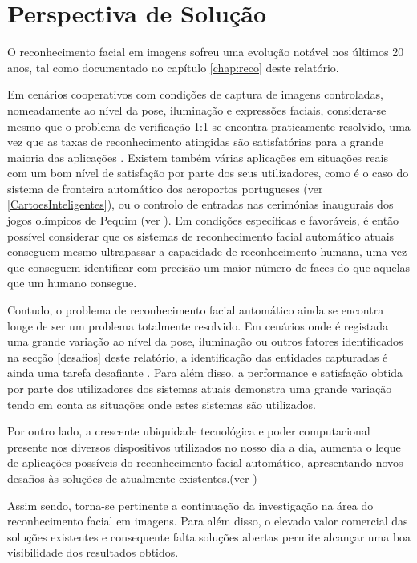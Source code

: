 \chapter{Perspectiva de Solução} \label{chap:solução}

O reconhecimento facial em imagens sofreu uma evolução notável nos últimos 20 anos, tal como documentado no capítulo \ref{chap:reco} deste relatório. 

Em cenários cooperativos com condições de captura de imagens controladas, nomeadamente ao nível da pose, iluminação e expressões faciais, considera-se mesmo que o problema de verificação 1:1 se encontra praticamente resolvido, uma vez que as taxas de reconhecimento atingidas são satisfatórias para a grande maioria das aplicações \citep{Li2011}. Existem também várias aplicações em situações reais com um bom nível de satisfação por parte dos seus utilizadores, como é o caso do sistema de fronteira automático dos aeroportos portugueses (ver \ref{CartoesInteligentes}), ou o controlo de entradas nas cerimónias inaugurais dos jogos olímpicos de Pequim (ver \label{Vigilancia}). Em condições específicas e favoráveis, é então possível considerar que os sistemas de reconhecimento facial automático atuais conseguem mesmo ultrapassar a capacidade de reconhecimento humana, uma vez que conseguem identificar com precisão um maior número de faces do que aquelas que um humano consegue.

Contudo, o problema de reconhecimento facial automático ainda se encontra longe de ser um problema totalmente resolvido. Em cenários onde é registada uma grande variação ao nível da pose, iluminação ou outros fatores identificados na secção \ref{desafios} deste relatório, a identificação das entidades capturadas é ainda uma tarefa desafiante  \citep{Li2011}. Para além disso, a performance e satisfação obtida por parte dos utilizadores dos sistemas atuais demonstra uma grande variação tendo em conta as situações onde estes sistemas são utilizados. 

Por outro lado, a crescente ubiquidade tecnológica e poder computacional presente nos diversos dispositivos utilizados no nosso dia a dia, aumenta o leque de aplicações possíveis do reconhecimento facial automático, apresentando novos desafios às soluções de atualmente existentes.(ver \label{sec:areasaplicacao})

Assim sendo, torna-se pertinente a continuação da investigação na área do reconhecimento facial em imagens. Para além disso, o elevado valor comercial das soluções existentes e consequente falta soluções abertas permite alcançar uma boa visibilidade dos resultados obtidos.

